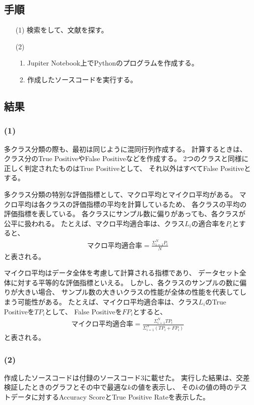\documentclass[12pt]{jarticle}
\begin{document}
\subsection{手順}
\begin{itemize}
    \item [(1)]検索をして、文献を探す。
    \item [(2)]\begin{enumerate}
              \item Jupiter Notebook上でPythonのプログラムを作成する。
              \item 作成したソースコードを実行する。
          \end{enumerate}
\end{itemize}

\subsection{結果}
\subsubsection*{(1)}
多クラス分類の際も、最初は同じように混同行列作成する。
計算するときは、クラス分のTrue PositiveやFalse Positiveなどを作成する。
2つのクラスと同様に正しく判定されたものはTrue Positiveとして、
それ以外はすべてFalse Positiveとする。

多クラス分類の特別な評価指標として、マクロ平均とマイクロ平均がある。
マクロ平均は各クラスの評価指標の平均を計算しているため、
各クラスの平均の評価指標を表している。
各クラスにサンプル数に偏りがあっても、各クラスが公平に扱われる。
たとえば、マクロ平均適合率は、クラス$L_i$の適合率を$P_i$とすると、
\begin{eqnarray}
    \text{マクロ平均適合率}=\frac{\Sigma^N_{i=1} P_i}{N} \nonumber
\end{eqnarray}
と表される。

マイクロ平均はデータ全体を考慮して計算される指標であり、
データセット全体に対する平等的な評価指標といえる。
しかし、各クラスのサンプルの数に偏りが大きい場合、
サンプル数の大きいクラスの性能が全体の性能を代表してしまう可能性がある。
たとえば、マイクロ平均適合率は、クラス$L_i$のTrue Positiveを$TP_i$として、
False Positiveを$FP_i$とすると、
\begin{eqnarray}
    \text{マイクロ平均適合率}=\frac{\Sigma^N_{i=1} TP_i}{\Sigma^N_{i=1} (TP_i+FP_i)} \nonumber
\end{eqnarray}
と表される。

\subsubsection*{(2)}
作成したソースコードは付録のソースコード3に載せた。
実行した結果は、交差検証したときのグラフとその中で最適な$k$の値を表示し、
その$k$の値の時のテストデータに対するAccuracy ScoreとTrue Positive Rateを表示した。
\end{document}

